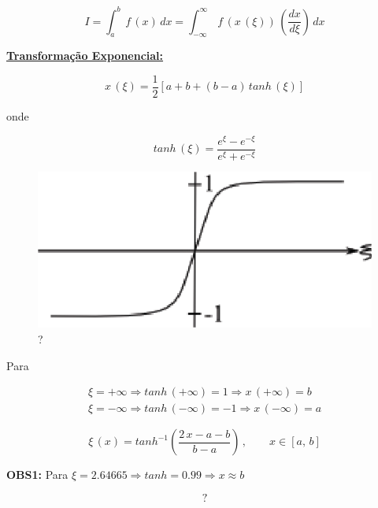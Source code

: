 \begin{equation}
 \label{cap2:sec8:eq1}
 I = \int_a^b \, f\,(x) \, dx = \int_{-\infty}^\infty \, f\,(x\,(\xi)) \, \left( \frac{dx}{d\xi} \right) \, dx
\end{equation}

\underline{\textbf{Transformação Exponencial:}}

\begin{equation}
 \label{cap2:sec8:eq2}
 x\,(\xi) = \frac{1}{2} \left[ a + b + (b - a) \, tanh\,(\xi) \right]
\end{equation}

onde

\begin{equation}
 \label{cap2:sec8:eq3}
 tanh\,(\xi) = \frac{e^\xi - e^{-\xi}}{e^\xi + e^{-\xi}}
\end{equation}

\begin{figure}[htb]
 \centering
 \includegraphics[scale=1.0]{capitulos/capitulo2/figuras/int_func_lim_inf3.eps}
 \caption{?}
 \label{fig:int_func_lim_inf3}
\end{figure}

Para

\[
 \begin{array}{l}
  \xi = + \infty \Rightarrow tanh\,(+\infty) = 1 \Rightarrow x\,(+\infty) = b \\
  \xi = - \infty \Rightarrow tanh\,(-\infty) = -1 \Rightarrow x\,(-\infty) = a
 \end{array}
\]

\begin{equation}
 \label{cap2:sec8:eq4}
 \xi\,(x) = tanh^{-1} \left( \frac{2\,x - a - b}{b - a} \right)\,, \qquad x \in [a,\,b]
\end{equation}

\textbf{OBS1:} Para $\xi = 2.64665 \Rightarrow tanh = 0.99 \Rightarrow x \approx b$

\[
 ?
\]

